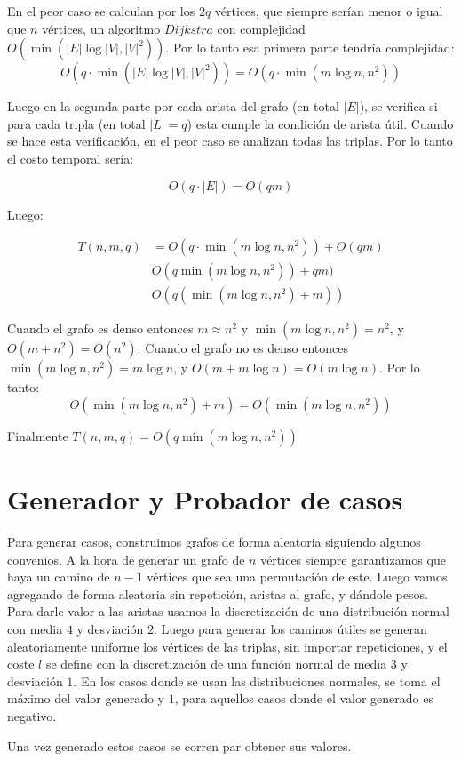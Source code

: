 \documentclass[a4paper]{article}
\begin{document}
	En el peor caso se calculan por los $2q$ vértices, que siempre serían menor o igual que $n$ vértices, un algoritmo $Dijkstra$ con complejidad $O(\min(|E|\log|V|, |V|^2))$. Por lo tanto esa primera parte tendría complejidad:
	$$ O(q \cdot \min(|E|\log|V|, |V|^2)) = O(q\cdot \min(m\log n, n^2)) $$
	
	Luego en la segunda parte por cada arista del grafo (en total $|E|$), se verifica si para cada tripla (en total $|L| = q$) esta cumple la condición de arista útil. Cuando se hace esta verificación, en el peor caso se analizan todas las triplas. Por lo tanto el costo temporal sería:
	
	$$ O(q \cdot |E|) = O(qm) $$
	
	Luego:
	
	\begin{align*}
		T(n,m,q) & = O(q\cdot \min(m\log n, n^2)) + O(qm)\\
		& O(q \min(m\log n, n^2)) + qm) \\
		& O(q (\min(m\log n, n^2) + m))
	\end{align*}

	Cuando el grafo es denso entonces $m \approx n^2$ y $\min(m\log n, n^2) = n^2$, y $O(m + n^2) = O(n^2)$. Cuando el grafo no es denso entonces $\min(m\log n, n^2) = m\log n$, y $O(m + m\log n) = O(m\log n)$. Por lo tanto:
	$$ O(\min(m\log n, n^2) + m) = O(\min(m\log n, n^2)) $$
	
	Finalmente $T(n,m,q) = O(q\min(m\log n, n^2))$
			
    \section*{Generador y Probador de casos}
    
    Para generar casos, construimos grafos de forma aleatoria siguiendo algunos convenios. A la hora de generar un grafo de $n$ vértices siempre garantizamos que haya un camino de $n-1$ vértices que sea una permutación de este. Luego vamos agregando de forma aleatoria sin repetición, aristas al grafo, y dándole pesos. Para darle valor a las aristas usamos la discretización de una distribución normal con media $4$ y desviación $2$. Luego para generar los caminos útiles se generan aleatoriamente uniforme los vértices de las triplas, sin importar repeticiones, y el coste $l$ se define con la discretización de una función normal de media $3$ y desviación $1$. En los casos donde se usan las distribuciones normales, se toma el máximo del valor generado y $1$, para aquellos casos donde el valor generado es negativo.
    
    Una vez generado estos casos se corren par obtener sus valores.
    
    
\end{document}
